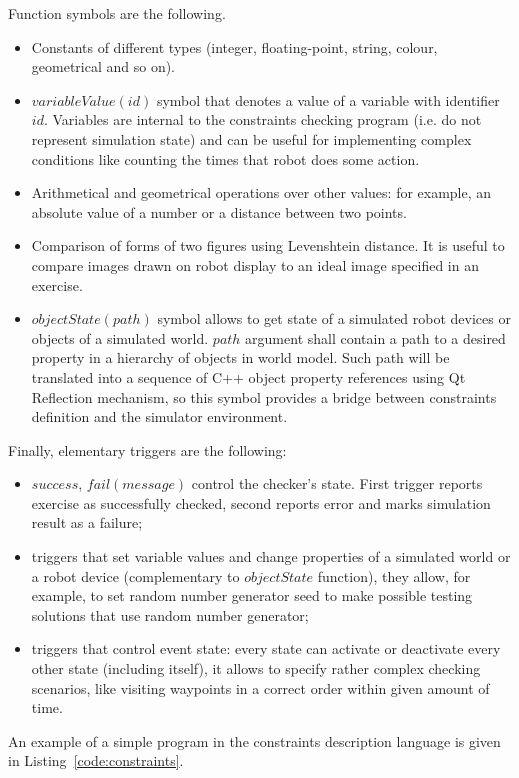 \documentclass[conference]{IEEEtran}
\begin{document}
Function symbols are the following.
\begin{itemize}
    \item Constants of different types (integer, floating-point, string, colour, geometrical and so on).
    \item $variableValue(id)$ symbol that denotes a value of a variable with identifier $id$. Variables are internal to the constraints checking program (i.e. do not represent simulation state) and can be useful for implementing complex conditions like counting the times that robot does some action.
    \item Arithmetical and geometrical operations over other values: for example, an absolute value of a number or a distance between two points.
    \item Comparison of forms of two figures using Levenshtein distance. It is useful to compare images drawn on robot display to an ideal image specified in an exercise.
    \item $objectState(path)$ symbol allows to get state of a simulated robot devices or objects of a simulated world. $path$ argument shall contain a path to a desired property in a hierarchy of objects in world model. Such path will be translated into a sequence of C++ object property references using Qt Reflection mechanism, so this symbol provides a bridge between constraints definition and the simulator environment.
\end{itemize}

Finally, elementary triggers are the following:
\begin{itemize}
    \item $success$, $fail(message)$ control the checker's state. First trigger reports exercise as successfully checked, second reports error and marks simulation result as a failure;
    \item triggers that set variable values and change properties of a simulated world or a robot device (complementary to $objectState$ function), they allow, for example, to set random number generator seed to make possible testing solutions that use random number generator;
    \item triggers that control event state: every state can activate or deactivate every other state (including itself), it allows to specify rather complex checking scenarios, like visiting waypoints in a correct order within given amount of time.
\end{itemize}

An example of a simple program in the constraints description language is given in Listing~\ref{code:constraints}.
\end{document}

